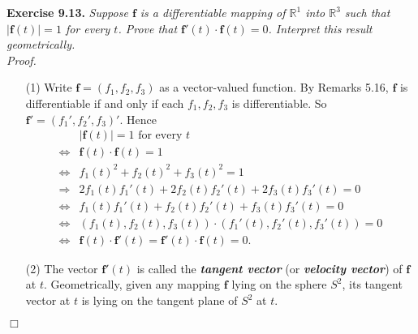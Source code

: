 \documentclass{article}
\begin{document}



\textbf{Exercise 9.13.}
\emph{Suppose $\mathbf{f}$ is a differentiable mapping of $\mathbb{R}^1$ into
$\mathbb{R}^3$ such that $|\mathbf{f}(t)| = 1$ for every $t$.
Prove that $\mathbf{f}'(t) \cdot \mathbf{f}(t) = 0$.
Interpret this result geometrically.} \\

\emph{Proof.}
\begin{enumerate}
\item[(1)]
  Write $\mathbf{f} = (f_1, f_2, f_3)$ as a vector-valued function.
  By Remarks 5.16, $\mathbf{f}$ is differentiable if and only if each $f_1, f_2, f_3$
  is differentiable. So $\mathbf{f}' = (f_1', f_2', f_3)'$.
  Hence
  \begin{align*}
    &\text{$|\mathbf{f}(t)| = 1$ for every $t$} \\
    \Longleftrightarrow&
    \mathbf{f}(t) \cdot \mathbf{f}(t) = 1 \\
    \Longleftrightarrow&
    f_1(t)^2 + f_2(t)^2 + f_3(t)^2 = 1 \\
    \Longrightarrow&
    2 f_1(t) f_1'(t) + 2 f_2(t) f_2'(t) + 2 f_3(t) f_3'(t) = 0 \\
    \Longleftrightarrow&
    f_1(t) f_1'(t) + f_2(t) f_2'(t) + f_3(t) f_3'(t) = 0 \\
    \Longleftrightarrow&
    (f_1(t), f_2(t), f_3(t)) \cdot (f_1'(t), f_2'(t), f_3'(t)) = 0 \\
    \Longleftrightarrow&
    \mathbf{f}(t) \cdot \mathbf{f}'(t) = \mathbf{f}'(t) \cdot \mathbf{f}(t) = 0.
  \end{align*}

\item[(2)]
  The vector $\mathbf{f}'(t)$ is called the
  \emph{\textbf{tangent vector}} (or \emph{\textbf{velocity vector}})
  of $\mathbf{f}$ at $t$.
  Geometrically,
  given any mapping $\mathbf{f}$ lying on the sphere $S^2$,
  its tangent vector at $t$ is lying on the tangent plane of $S^2$ at $t$.
\end{enumerate}
$\Box$ \\\\



\end{document}
